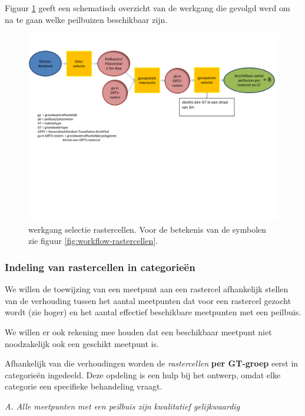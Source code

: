 \documentclass[11pt,]{book}
\begin{document}
Figuur \ref{fig:workflow-selectiepb-part1} geeft een schematisch
overzicht van de werkgang die gevolgd werd om na te gaan welke
peilbuizen beschikbaar zijn.




\begin{figure}
\includegraphics[width=10in]{figures/workflow_pbselectie_part1} \caption{werkgang selectie rastercellen. Voor de
betekenis van de symbolen zie figuur \ref{fig:workflow-rastercellen}.}\label{fig:workflow-selectiepb-part1}
\end{figure}

\subsubsection{Indeling van rastercellen in
categorieën}\label{indeling-cat}

We willen de toewijzing van een meetpunt aan een rastercel afhankelijk
stellen van de verhouding tussen het aantal meetpunten dat voor een
rastercel gezocht wordt (zie hoger) en het aantal effectief beschikbare
meetpunten met een peilbuis.

We willen er ook rekening mee houden dat een beschikbaar meetpunt niet
noodzakelijk ook een geschikt meetpunt is.

Afhankelijk van die verhoudingen worden de \emph{rastercellen}
\textbf{per GT-groep} eerst in categorieën ingedeeld. Deze opdeling is
een hulp bij het ontwerp, omdat elke categorie een specifieke
behandeling vraagt.

\emph{A. Alle meetpunten met een peilbuis zijn kwalitatief
gelijkwaardig}
\end{document}
